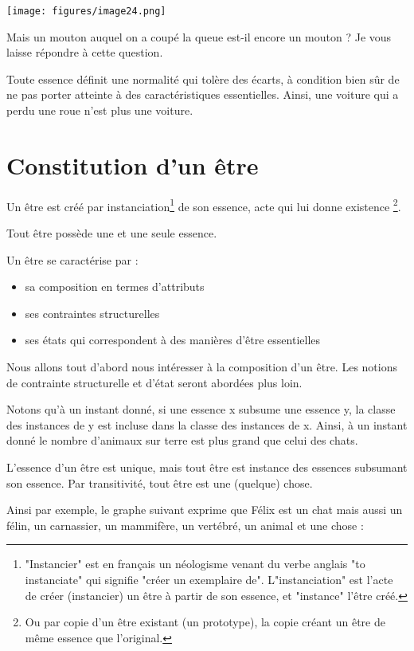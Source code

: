 \documentclass[a4paper, 12pt, openright, french]{book}
\begin{document}
\texttt{[image: figures/image24.png]}

Mais un mouton auquel on a coupé la queue est-il encore un mouton ? Je
vous laisse répondre à cette question.

Toute essence définit une normalité qui tolère des écarts, à condition
bien sûr de ne pas porter atteinte à des caractéristiques essentielles.
Ainsi, une voiture qui a perdu une roue n'est plus une
voiture.

\newpage
\section{Constitution d'un être}
Un être est créé par instanciation\footnote{"Instancier" est en français un néologisme venant du
	verbe anglais "to instanciate" qui signifie "créer un exemplaire de". L"instanciation" est l'acte de créer (instancier) un être à
	partir de son essence, et "instance" l'être créé.} de son essence,
acte qui lui donne existence \footnote{Ou par copie d'un être existant (un
	prototype), la copie créant un être de même essence que
	l'original.}.

Tout être possède une et une seule essence.

Un être se caractérise par :

\begin{itemize}
\item
  sa composition en termes d'attributs
\item
  ses contraintes structurelles
\item
  ses états qui correspondent à des manières d'être
  essentielles
\end{itemize}

Nous allons tout d'abord nous intéresser à la
composition d'un être. Les notions de contrainte
structurelle et d'état seront abordées plus loin.

Notons qu'à un instant donné, si une essence x subsume
une essence y, la classe des instances de y est incluse dans la classe
des instances de x. Ainsi, à un instant donné le nombre
d'animaux sur terre est plus grand que celui des chats.

L'essence d'un être est unique, mais
tout être est instance des essences subsumant son essence. Par
transitivité, tout être est une (quelque) chose.

Ainsi par exemple, le graphe suivant exprime que Félix est un chat mais
aussi un félin, un carnassier, un mammifère, un vertébré, un animal et
une chose :
\end{document}
